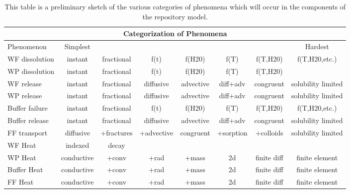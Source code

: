 %
\begin{table}
  \centering
  \footnotesize{
  \begin{tabularx}{\textwidth}{|l|c|c|c|c|c|c|c|}
    \multicolumn{8}{c}{\textbf{Categorization of Phenomena}}\\
    \hline
     Phenomenon&Simplest&&&&&&Hardest\\
    \hline
     WF dissolution&instant&fractional&f(t)&f(H20)&f(T)&f(T,H20)&f(T,H20,etc.)\\
     WP dissolution&instant&fractional&f(t)&f(H20)&f(T)&f(T,H20)&\\
     WF release&instant&fractional&diffusive&advective&diff+adv&congruent&solubility limited\\
     WP release&instant&fractional&diffusive&advective&diff+adv&congruent&solubility limited\\
     Buffer failure&instant&fractional&f(t)&f(H20)&f(T)&f(T,H20)&f(T,H20,etc.)\\
     Buffer release &instant&fractional&diffusive&advective&diff+adv&congruent&solubility limited\\
     FF transport &diffusive&+fractures&+advective&congruent&+sorption&+colloids&solubility limited\\
     WF Heat&indexed&decay&&&&&\\
     WP Heat&conductive&+conv&+rad&+mass&2d&finite diff&finite element\\
     Buffer Heat&conductive&+conv&+rad&+mass&2d&finite diff&finite element\\
     FF Heat&conductive&+conv&+rad&+mass&2d&finite diff&finite element\\
    \hline
  \end{tabularx}
  \caption[Categorization of Phenomena]{This table is a preliminary sketch of 
  the various categories of phenomena which will occur in the components of the  
  repository model.}
  \label{tab:cat}
  }
\end{table}


